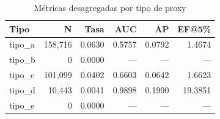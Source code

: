\begin{table}[htbp]
\centering
\small
\caption{Métricas desagregadas por tipo de proxy}
\label{tab:sensitivity-per-type}
\begin{tabular}{lrrrrr}
\toprule
Tipo & N & Tasa & AUC & AP & EF@5\% \\
\midrule
  tipo\_a & 158,716 & 0.0630 & 0.5757 & 0.0792 & 1.4674 \\
  tipo\_b & 0 & 0.0000 & --- & --- & --- \\
  tipo\_c & 101,099 & 0.0402 & 0.6603 & 0.0642 & 1.6623 \\
  tipo\_d & 10,443 & 0.0041 & 0.9898 & 0.1990 & 19.3851 \\
  tipo\_e & 0 & 0.0000 & --- & --- & --- \\
\bottomrule
\end{tabular}
\end{table}
